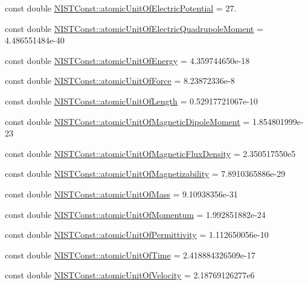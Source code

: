 \begin{DoxyCompactItemize}
const double \hyperlink{group___atomic_unit_ga139c6486b1899658838d403380fc229a}{N\+I\+S\+T\+Const\+::atomic\+Unit\+Of\+Electric\+Potential} = 27.
\item 
const double \hyperlink{group___atomic_unit_gae7f2ec900567291168cdf7351248074d}{N\+I\+S\+T\+Const\+::atomic\+Unit\+Of\+Electric\+Quadrupole\+Moment} = 4.\+486551484e-\/40
\item 
const double \hyperlink{group___atomic_unit_gadc3fdb8850235efe9e73bcf733fdbfe8}{N\+I\+S\+T\+Const\+::atomic\+Unit\+Of\+Energy} = 4.\+359744650e-\/18
\item 
const double \hyperlink{group___atomic_unit_ga2788fede3c8dab37305c9510cbb95001}{N\+I\+S\+T\+Const\+::atomic\+Unit\+Of\+Force} = 8.\+23872336e-\/8
\item 
const double \hyperlink{group___atomic_unit_ga246e4c3edecdd5aa1d5d208fc02a4636}{N\+I\+S\+T\+Const\+::atomic\+Unit\+Of\+Length} = 0.\+52917721067e-\/10
\item 
const double \hyperlink{group___atomic_unit_ga56b280760cc855923e548c6676d90916}{N\+I\+S\+T\+Const\+::atomic\+Unit\+Of\+Magnetic\+Dipole\+Moment} = 1.\+854801999e-\/23
\item 
const double \hyperlink{group___atomic_unit_gaaf4c9b5c25a5e1bee2f65c8a82e0ee63}{N\+I\+S\+T\+Const\+::atomic\+Unit\+Of\+Magnetic\+Flux\+Density} = 2.\+350517550e5
\item 
const double \hyperlink{group___atomic_unit_ga9c2b29b9a46e8dfd78837ef0c8a16bec}{N\+I\+S\+T\+Const\+::atomic\+Unit\+Of\+Magnetizability} = 7.\+8910365886e-\/29
\item 
const double \hyperlink{group___atomic_unit_ga61a2da51489f7bb8965e9e4747db34a7}{N\+I\+S\+T\+Const\+::atomic\+Unit\+Of\+Mass} = 9.\+10938356e-\/31
\item 
const double \hyperlink{group___atomic_unit_gae70262618755d765a1de59f471b56040}{N\+I\+S\+T\+Const\+::atomic\+Unit\+Of\+Momentum} = 1.\+992851882e-\/24
\item 
const double \hyperlink{group___atomic_unit_ga0b7518cf6058bb899c64b32b43bda955}{N\+I\+S\+T\+Const\+::atomic\+Unit\+Of\+Permittivity} = 1.\+112650056e-\/10
\item 
const double \hyperlink{group___atomic_unit_ga6181f64b8320afb6ecacc9c7f7e27afa}{N\+I\+S\+T\+Const\+::atomic\+Unit\+Of\+Time} = 2.\+418884326509e-\/17
\item 
const double \hyperlink{group___atomic_unit_gaf22e630a5412176c4d94dbc8b1e36f70}{N\+I\+S\+T\+Const\+::atomic\+Unit\+Of\+Velocity} = 2.\+18769126277e6
\item 

\end{DoxyCompactItemize}
